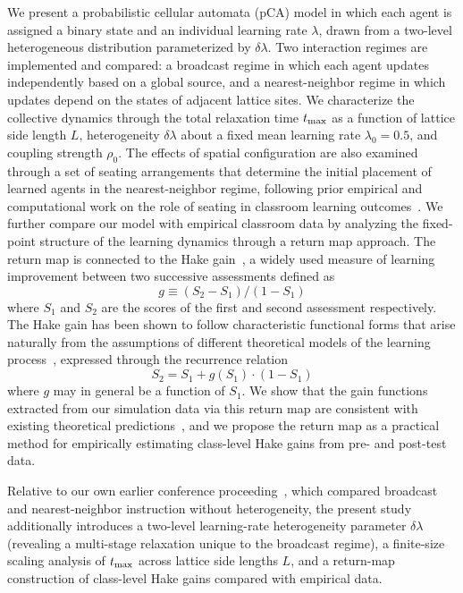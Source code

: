 \documentclass[a4paper,fleqn]{cas-sc}
\begin{document}
We present a probabilistic cellular automata (pCA) model in which each agent is assigned a binary state and an individual learning rate $\lambda$, drawn from a two-level heterogeneous distribution parameterized by $\delta\lambda$.
Two interaction regimes are implemented and compared: a broadcast regime in which each agent updates independently based on a global source, and a nearest-neighbor regime in which updates depend on the states of adjacent lattice sites.
We characterize the collective dynamics through the total relaxation time $t_{\rm max}$ as a function of lattice side length $L$, heterogeneity $\delta\lambda$ about a fixed mean learning rate $\lambda_0=0.5$, and coupling strength $\rho_0$.
The effects of spatial configuration are also examined through a set of seating arrangements that determine the initial placement of learned agents in the nearest-neighbor regime, following prior empirical and computational work on the role of seating in classroom learning outcomes~\citep{roxas2010seating, monterola2009}.
We further compare our model with empirical classroom data by analyzing the fixed-point structure of the learning dynamics through a return map approach.
The return map is connected to the Hake gain~\citep{hake1998}, a widely used measure of learning improvement between two successive assessments defined as
\begin{equation}
    g \equiv (S_2 - S_1) / (1 - S_1)
\end{equation}
where $S_1$ and $S_2$ are the scores of the first and second assessment respectively.
The Hake gain has been shown to follow characteristic functional forms that arise naturally from the assumptions of different theoretical models of the learning process~\citep{nitta2019mathematical, pritchard2008mathematical}, expressed through the recurrence relation
\begin{equation}
    S_2 = S_1 + g(S_1) \cdot (1 - S_1)
\end{equation}
where $g$ may in general be a function of $S_1$.
We show that the gain functions extracted from our simulation data via this return map are consistent with existing theoretical predictions~\citep{nitta2019mathematical, pritchard2008mathematical}, and we propose the return map as a practical method for empirically estimating class-level Hake gains from pre- and post-test data.

 Relative to our own earlier conference proceeding~\citep{SelfSPP}, which compared broadcast and nearest-neighbor instruction without heterogeneity, the present study additionally introduces a two-level learning-rate heterogeneity parameter $\delta\lambda$ (revealing a multi-stage relaxation unique to the broadcast regime), a finite-size scaling analysis of $t_{\rm max}$ across lattice side lengths $L$, and a return-map construction of class-level Hake gains compared with empirical data.
\end{document}
